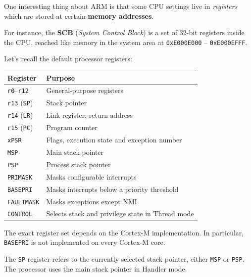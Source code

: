 \documentclass[a4paper,11pt]{article}
\begin{document}
One interesting thing about ARM is that some CPU settings live in \textit{registers} which are stored at certain \textbf{memory addresses}.

For instance, the \textbf{SCB} (\textit{System Control Block}) is a set of 32-bit registers inside the CPU, reached like memory in the system area at \texttt{0xE000E000} – \texttt{0xE000EFFF}.

Let's recall the default processor registers:
\begin{table}[H]
	\centering
	\begin{tabular}{ll}
		\hline
		Register                   & Purpose                                          \\
		\hline
		\texttt{r0}--\texttt{r12}  & General-purpose registers                        \\
		\texttt{r13} (\texttt{SP}) & Stack pointer                                    \\
		\texttt{r14} (\texttt{LR}) & Link register; return address                    \\
		\texttt{r15} (\texttt{PC}) & Program counter                                  \\
		\texttt{xPSR}              & Flags, execution state and exception number      \\
		\texttt{MSP}               & Main stack pointer                               \\
		\texttt{PSP}               & Process stack pointer                            \\
		\texttt{PRIMASK}           & Masks configurable interrupts                    \\
		\texttt{BASEPRI}           & Masks interrupts below a priority threshold      \\
		\texttt{FAULTMASK}         & Masks exceptions except NMI                      \\
		\texttt{CONTROL}           & Selects stack and privilege state in Thread mode \\
		\hline
	\end{tabular}
\end{table}

The exact register set depends on the Cortex-M implementation. In
particular, \texttt{BASEPRI} is not implemented on every Cortex-M core.

The \texttt{SP} register refers to the currently selected stack pointer,
either \texttt{MSP} or \texttt{PSP}. The processor uses the main stack
pointer in Handler mode.
\end{document}
